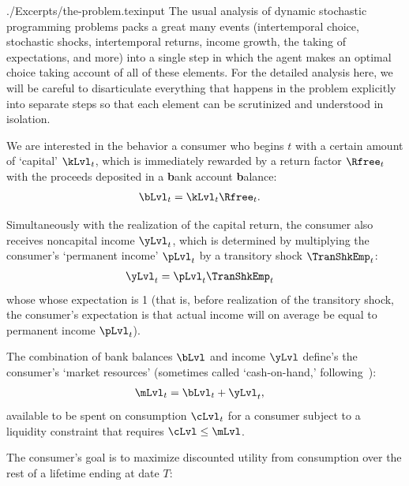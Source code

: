 \documentclass[titlepage, headings=optiontotocandhead]{\econtex}
\begin{document}
    \begin{verbatimwrite}{./Excerpts/the-problem.texinput}
      The usual analysis of dynamic stochastic programming problems packs a great many events (intertemporal choice, stochastic shocks, intertemporal returns, income growth, the taking of expectations, and more) into a single step in which the agent makes an optimal choice taking account of all of these elements. For the detailed analysis here, we will be careful to disarticulate everything that happens in the problem explicitly into separate steps so that each element can be scrutinized and understood in isolation.

      We are interested in the behavior a consumer who begins {\interval} $t$ with a certain amount of `capital' $\kLvl_{t}$, which is immediately rewarded by a return factor $\Rfree_{t}$ with the proceeds deposited in a \textbf{b}ank account \textbf{b}alance:
      \begin{equation}\begin{gathered}\begin{aligned}
        \bLvl_{t} & = \kLvl_{t}\Rfree_{t}. \label{eq:bLvl}
      \end{aligned}\end{gathered}\end{equation}

  Simultaneously with the realization of the capital return, the consumer also receives noncapital income $\yLvl_{t}$, which is determined by multiplying the consumer's `permanent income' $\pLvl_{t}$ by a transitory shock $\TranShkEmp_{t}$:
  \begin{equation}\begin{gathered}\begin{aligned}
    \yLvl_{t} & = \pLvl_{t}\TranShkEmp_{t} \label{eq:yLvl}
  \end{aligned}\end{gathered}\end{equation}
whose whose expectation is 1 (that is, before realization of the transitory shock, the consumer's expectation is that actual income will on average be equal to permanent income $\pLvl_{t}$).

The combination of bank balances $\bLvl$ and income $\yLvl$ define's the consumer's `market resources' (sometimes called `cash-on-hand,' following~\cite{deatonUnderstandingC}):
\begin{equation}\begin{gathered}\begin{aligned}
  \mLvl_{t} & = \bLvl_{t}+\yLvl_{t} \label{eq:mLvl},
\end{aligned}\end{gathered}\end{equation}
available to be spent on consumption $\cLvl_{t}$ for a consumer subject to a liquidity constraint that requires $\cLvl \leq \mLvl$.

The consumer's goal is to maximize discounted utility from consumption over the rest of a lifetime ending at date $T$:
\end{verbatimwrite}
\end{document}
